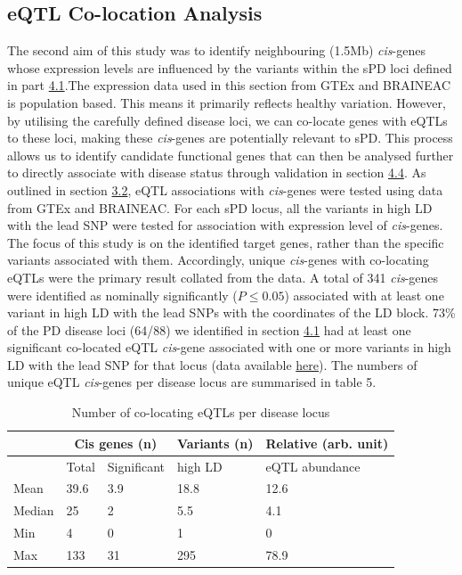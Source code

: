 \documentclass{article}
\begin{document}
\subsection{eQTL Co-location Analysis}
\label{subsec:eQTLcoloc}
The second aim of this study was to identify neighbouring (\pm1.5Mb) \textit{cis}-genes whose expression levels are influenced by the variants within the sPD loci defined in part \hyperref[subsec:blocks]{4.1}.The expression data used in this section from GTEx and BRAINEAC is population based. This means it primarily reflects healthy variation. However, by utilising the carefully defined disease loci, we can co-locate genes with eQTLs to these loci, making these \textit{cis}-genes are potentially relevant to sPD. This process allows us to identify candidate functional genes that can then be analysed further to directly associate with disease status through validation in section \hyperref[subsec:DGE]{4.4}. As outlined in section \hyperref[subsec:eQTL]{3.2}, eQTL associations with \textit{cis}-genes were tested using data from GTEx\cite{Aguet2020TheTissues} and BRAINEAC\cite{Ramasamy2014GeneticBrain}.
For each sPD locus, all the variants in high LD with the lead SNP were tested for association with expression level of \textit{cis}-genes. The focus of this study is on the identified target genes, rather than the specific variants associated with them. Accordingly, unique \textit{cis}-genes with co-locating eQTLs were the primary result collated from the data. A total of 341 \textit{cis}-genes were identified as nominally significantly ($P \leq 0.05$) associated with at least one variant in high LD with the lead SNPs with the coordinates of the LD block. 73\% of the PD disease loci (64/88) we identified in section \hyperref[subsec:blocks]{4.1} had at least one significant co-located eQTL \textit{cis}-gene associated with one or more variants in high LD with the lead SNP for that locus (data available \href{https://github.com/Thomas-brightwell/PD-MSc-project-code/blob/main/Thesis/Supplementary%20materials/Supplementary%20Results%20table%20.csv}{here}). The numbers of unique eQTL \textit{cis}-genes per disease locus are summarised in table 5.
\begin{table}[h]
\centering
\caption{Number of co-locating eQTLs per disease locus}
\label{tab:my-table}
\begin{tabular}{|l|ll|l|l|}
\hline
       & \multicolumn{2}{c|}{Cis genes (n)}       & Variants (n) & Relative (arb. unit) \\ \hline
       & \multicolumn{1}{l|}{Total} & Significant & high LD      & eQTL abundance       \\ \hline
Mean   & \multicolumn{1}{l|}{39.6}  & 3.9         & 18.8         & 12.6                 \\ \hline
Median & \multicolumn{1}{l|}{25}    & 2           & 5.5          & 4.1                  \\ \hline
Min    & \multicolumn{1}{l|}{4}     & 0           & 1            & 0                    \\ \hline
Max    & \multicolumn{1}{l|}{133}   & 31          & 295          & 78.9                 \\ \hline
\end{tabular}
\end{table}
\end{document}

